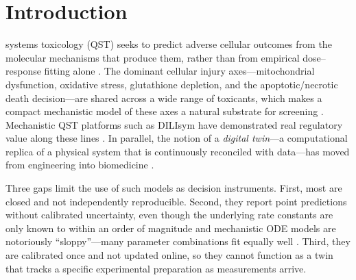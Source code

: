 \documentclass[journal]{IEEEtran}
\begin{document}
\section{Introduction}

 systems toxicology (QST) seeks to predict adverse
cellular outcomes from the molecular mechanisms that produce them, rather than
from empirical dose--response fitting alone \cite{bloomingdale2017,watkins2020}.
The dominant cellular injury axes---mitochondrial dysfunction, oxidative stress,
glutathione depletion, and the apoptotic/necrotic death decision---are shared
across a wide range of toxicants, which makes a compact mechanistic model of
these axes a natural substrate for screening \cite{yang2022,albeck2008}.
Mechanistic QST platforms such as DILIsym have demonstrated real regulatory value
along these lines \cite{watkins2020}. In parallel, the notion of a
\emph{digital twin}---a computational replica of a physical system that is
continuously reconciled with data---has moved from engineering into biomedicine
\cite{laubenbacher2022,corral2020}.

Three gaps limit the use of such models as decision instruments. First, most are
closed and not independently reproducible. Second, they report point predictions
without calibrated uncertainty, even though the underlying rate constants are
only known to within an order of magnitude and mechanistic ODE models are
notoriously ``sloppy''---many parameter combinations fit equally well
\cite{gutenkunst2007,transtrum2015}. Third, they are calibrated once and not
updated online, so they cannot function as a twin that tracks a specific
experimental preparation as measurements arrive.
\end{document}
